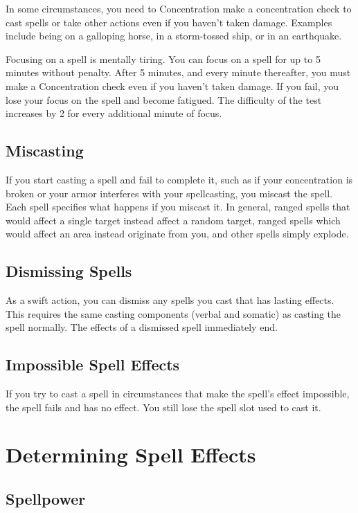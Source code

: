  In some circumstances, you need to Concentration make a concentration check to cast spells or take other actions even if you haven't taken damage. Examples include being on a galloping horse, in a storm-tossed ship, or in an earthquake.

 Focusing on a spell is mentally tiring. You can focus on a spell for up to 5 minutes without penalty. After 5 minutes, and every minute thereafter, you must make a Concentration check even if you haven't taken damage. If you fail, you lose your focus on the spell and become fatigued. The difficulty of the test increases by 2 for every additional minute of focus.

\subsection{Miscasting}\label{Miscasting}

If you start casting a spell and fail to complete it, such as if your concentration is broken or your armor interferes with your spellcasting, you miscast the spell. Each spell specifies what happens if you miscast it. In general, ranged spells that would affect a single target instead affect a random target, ranged spells which would affect an area instead originate from you, and other spells simply explode.

\subsection{Dismissing Spells}

As a swift action, you can dismiss any spells you cast that has lasting effects. This requires the same casting components (verbal and somatic) as casting the spell normally. The effects of a dismissed spell immediately end.

\subsection{Impossible Spell Effects}
If you try to cast a spell in circumstances that make the spell's effect impossible, the spell fails and has no effect. You still lose the spell slot used to cast it.

\section{Determining Spell Effects}

\subsection{Spellpower}

